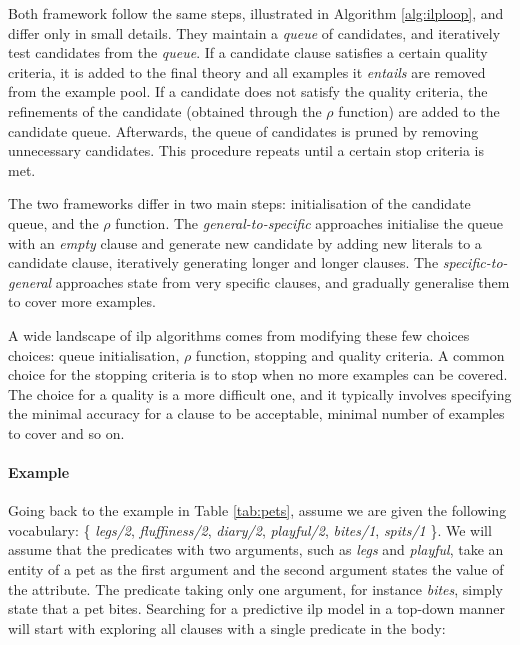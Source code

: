 Both framework follow the same steps, illustrated in Algorithm \ref{alg:ilploop}, and differ only in small details.
They maintain a \textit{queue} of candidates, and iteratively test candidates from the \textit{queue}.
If a candidate clause satisfies a certain quality criteria, it is added to the final theory and all examples it \textit{entails} are removed from the example pool.
If a candidate does not satisfy the quality criteria, the refinements of the candidate (obtained through the $\rho$ function) are added to the candidate queue.
Afterwards, the queue of candidates is pruned by removing unnecessary candidates.
This procedure repeats until a certain stop criteria is met.



The two frameworks differ in two main steps: initialisation of the candidate queue, and the $\rho$ function.
The \textit{general-to-specific} approaches initialise the queue with an \textit{empty} clause and generate new candidate by adding new literals to a candidate clause, iteratively generating longer and longer clauses.
The \textit{specific-to-general} approaches state from very specific clauses, and gradually generalise them to cover more examples.




A wide landscape of \gls{ilp} algorithms comes from modifying these few choices choices: queue initialisation, $\rho$ function, stopping and quality criteria.
A common choice for the stopping criteria is to stop when no more examples can be covered.
The choice for a quality is a more difficult one, and it typically involves specifying the minimal accuracy for a clause to be acceptable, minimal number of examples to cover and so on.




\paragraph{\textbf{Example}}
Going back to the example in Table \ref{tab:pets}, assume we are given the following vocabulary: \{ \textit{legs/2}, \textit{fluffiness/2}, \textit{diary/2}, \textit{playful/2}, \textit{bites/1}, \textit{spits/1} \}.
We will assume that the predicates with two arguments, such as \textit{legs} and \textit{playful}, take an entity of a pet as the first argument and the second argument states the value of the attribute.
The predicate taking only one argument, for instance \textit{bites}, simply state that a pet bites.
Searching for a predictive \gls{ilp} model in a top-down manner will start with exploring all clauses with a single predicate in the body:

